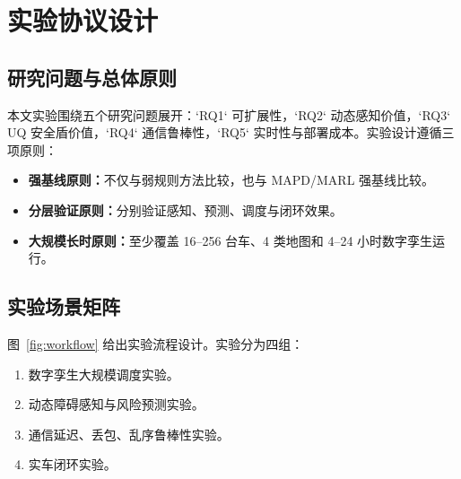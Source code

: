 \documentclass[UTF8,twocolumn,10pt]{ctexart}
\begin{document}
\section{实验协议设计}

\subsection{研究问题与总体原则}

本文实验围绕五个研究问题展开：`RQ1` 可扩展性，`RQ2` 动态感知价值，`RQ3` UQ 安全盾价值，`RQ4` 通信鲁棒性，`RQ5` 实时性与部署成本。实验设计遵循三项原则：
\begin{itemize}
  \item \textbf{强基线原则：}不仅与弱规则方法比较，也与 MAPD/MARL 强基线比较。
  \item \textbf{分层验证原则：}分别验证感知、预测、调度与闭环效果。
  \item \textbf{大规模长时原则：}至少覆盖 16--256 台车、4 类地图和 4--24 小时数字孪生运行。
\end{itemize}

\subsection{实验场景矩阵}

图~\ref{fig:workflow} 给出实验流程设计。实验分为四组：
\begin{enumerate}[leftmargin=1.3em,itemsep=1pt]
  \item 数字孪生大规模调度实验。
  \item 动态障碍感知与风险预测实验。
  \item 通信延迟、丢包、乱序鲁棒性实验。
  \item 实车闭环实验。
\end{enumerate}
\end{document}
